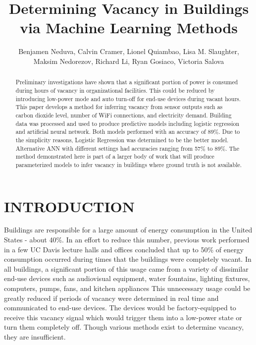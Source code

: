 \documentclass[letterpaper, 12 pt, conference]{ieeeconf}  %
\title{\LARGE \bf
Determining Vacancy in Buildings via Machine Learning Methods
}
\author{Benjamen Neduva, Calvin Cramer, Lionel Quiambao, Lisa M. Slaughter, \\
        Maksim Nedorezov, Richard Li, Ryan Gosiaco, Victoria Salova}
\begin{document}
\maketitle
\thispagestyle{empty}
\pagestyle{empty}


\begin{abstract}

Preliminary investigations have shown that a significant portion of power is consumed during hours of vacancy in organizational facilities. This could be reduced by introducing low-power mode and auto turn-off for end-use devices during vacant hours. This paper develops a method for inferring vacancy from sensor outputs such as carbon dioxide level, number of WiFi connections, and electricity demand. Building data was processed and used to produce predictive models including logistic regression and artificial neural network. Both models performed with an accuracy of 89\%. Due to the simplicity reasons, Logistic Regression was determined to be the better model. Alternative ANN with different settings had accuracies ranging from 57\% to 89\%. The method demonstrated here is part of a larger body of work that will produce parameterized models to infer vacancy in buildings where ground truth is not available. 

\end{abstract}

\section{INTRODUCTION}

Buildings are responsible for a large amount of energy consumption in the United States - about 40\%. \cite{Perez-Lombard} In an effort to reduce this number, previous work performed in a few UC Davis lecture halls and offices concluded that up to 50\% of energy consumption occurred during times that the buildings were completely vacant. In all buildings, a significant portion of this usage came from a variety of dissimilar end-use devices such as audiovisual equipment, water fountains, lighting fixtures, computers, pumps, fans, and kitchen appliances \cite{Casillas} This unnecessary usage could be greatly reduced if periods of vacancy were determined in real time and communicated to end-use devices. The devices would be factory-equipped to receive this vacancy signal which would trigger them into a low-power state or turn them completely off. Though various methods exist to determine vacancy, they are insufficient. 
\end{document}
